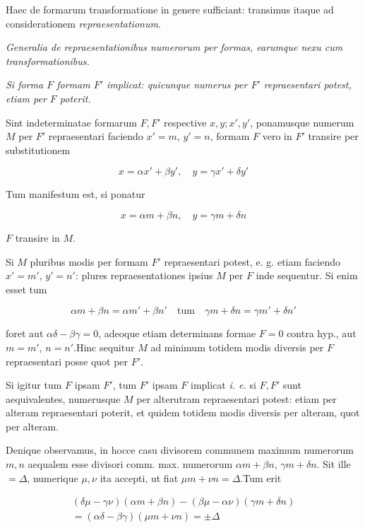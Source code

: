 Haec de formarum transformatione in genere sufficiant: transimus itaque ad considerationem \emph{repraesentationum}.

\begin{center}\emph{Generalia de repraesentationibus numerorum per formas, earumque nexu cum transformationibus.}\end{center}


\emph{Si forma $F$ formam $F'$ implicat: quicunque numerus per $F'$ repraesentari potest, etiam per $F$ poterit.}

Sint indeterminatae formarum $F,F'$ respective $x,y;x',y'$, ponamusque numerum $M$ per $F'$ repraesentari faciendo $x'=m$, $y'=n$, formam $F$ vero in $F'$ transire per substitutionem

\[
x=\alpha x'+\beta y',\quad y=\gamma x'+\delta y'
\]


Tum manifestum est, si ponatur

\[
x=\alpha m+\beta n,\quad y=\gamma m+\delta n
\]

$F$ transire in $M$.

Si $M$ pluribus modis per formam $F'$ repraesentari potest, e. g. etiam faciendo $x'=m'$, $y'=n'$: plures repraesentationes ipsius $M$ per $F$ inde sequentur. Si enim esset tum

\[
\alpha m+\beta n=\alpha m'+\beta n'\quad\text{tum}\quad\gamma m+\delta n=\gamma m'+\delta n'
\]

foret aut $\alpha\delta-\beta\gamma=0$, adeoque etiam determinans formae $F=0$ contra hyp., aut $m=m'$, $n=n'$.\quad Hinc sequitur $M$ ad minimum totidem modis diversis per $F$ repraesentari posse quot per $F'$.

Si igitur tum $F$ ipsam $F'$, tum $F'$ ipsam $F$ implicat \emph{i. e.} si $F,F'$ sunt aequivalentes, numerusque $M$ per alterutram repraesentari potest: etiam per alteram repraesentari poterit, et quidem totidem modis diversis per alteram, quot per alteram.

Denique observamus, in hocce casu divisorem communem maximum numerorum $m,n$ aequalem esse divisori comm. max. numerorum $\alpha m+\beta n$, $\gamma m+\delta n$. Sit ille $=\Delta$, numerique $\mu,\nu$ ita accepti, ut fiat $\mu m+\nu n=\Delta$.\quad Tum erit

\[
\begin{gathered}(\delta\mu-\gamma\nu)(\alpha m+\beta n)-(\beta\mu-\alpha\nu)(\gamma m+\delta n)\\=(\alpha\delta-\beta\gamma)(\mu m+\nu n)=\pm\Delta\end{gathered}
\]

